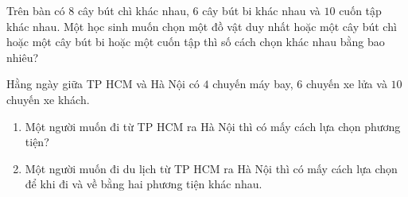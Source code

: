 \begin{vd}%
	Trên bàn có $8$ cây bút chì khác nhau, $6$ cây bút bi khác nhau và $10$ cuốn tập khác nhau. Một học sinh muốn chọn một đồ vật duy nhất hoặc một cây bút chì hoặc một cây bút bi hoặc một cuốn tập thì số cách chọn khác nhau bằng bao nhiêu?
\end{vd}

\begin{vd}%
	Hằng ngày giữa TP HCM và Hà Nội có $4$ chuyến máy bay, $6$ chuyến xe lửa và $10$ chuyến xe khách.
	\begin{enumerate}
		\item Một người muốn đi từ TP HCM ra Hà Nội thì có mấy cách lựa chọn phương tiện?
		\item Một người muốn đi  du lịch từ TP HCM ra Hà Nội thì có mấy cách lựa chọn để khi đi và về bằng hai phương tiện khác nhau.
	\end{enumerate}
\end{vd}

